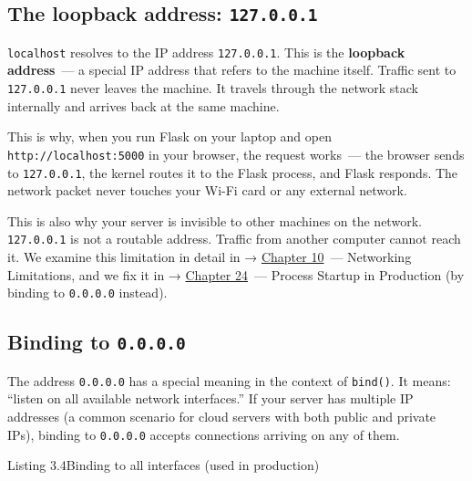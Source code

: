 \subsection*{\texorpdfstring{The loopback address: \texttt{127.0.0.1}}{The loopback address: 127.0.0.1}}\label{03-network-capability:the-loopback-address-127001}

\texttt{localhost} resolves to the IP address \texttt{127.0.0.1}. This is the \textbf{loopback address}~--- a special IP address that refers to the machine itself. Traffic sent to \texttt{127.0.0.1} never leaves the machine. It travels through the network stack internally and arrives back at the same machine.

This is why, when you run Flask on your laptop and open \texttt{http:/}\allowbreak{}\texttt{/}\allowbreak{}\texttt{localhost:5000} in your browser, the request works~--- the browser sends to \texttt{127.0.0.1}, the kernel routes it to the Flask process, and Flask responds. The network packet never touches your Wi-Fi card or any external network.

This is also why your server is invisible to other machines on the network. \texttt{127.0.0.1} is not a routable address. Traffic from another computer cannot reach it. We examine this limitation in detail in → \hyperref[ch:10-networking-limitations]{Chapter 10}~--- Networking Limitations, and we fix it in → \hyperref[ch:24-process-startup]{Chapter 24}~--- Process Startup in Production (by binding to \texttt{0.0.0.0} instead).

\subsection*{\texorpdfstring{Binding to \texttt{0.0.0.0}}{Binding to 0.0.0.0}}\label{03-network-capability:binding-to-0000}

The address \texttt{0.0.0.0} has a special meaning in the context of \texttt{bind()}. It means: ``listen on all available network interfaces.'' If your server has multiple IP addresses (a common scenario for cloud servers with both public and private IPs), binding to \texttt{0.0.0.0} accepts connections arriving on any of them.

\begin{codeboxcap}[short]{\textcolor{accent}{Listing 3.4}\enspace Binding to all interfaces (used in production)}

\begin{Shaded}
\begin{Highlighting}[]
\NormalTok{, }\NormalTok{))}
\end{Highlighting}
\end{Shaded}

\end{codeboxcap}

